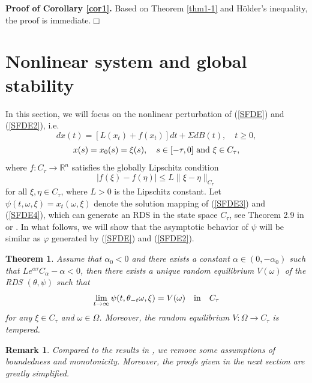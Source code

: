 \documentclass[preprint,12pt]{elsarticle}
\newtheorem{theorem}{Theorem}[section]
\newtheorem{remark}{Remark}[section]
\begin{document}
\noindent
{\bf Proof of Corollary \ref{cor1}.} Based on Theorem \ref{thm1-1} and H\"{o}lder's inequality, the proof is immediate.\quad\quad$\Box$


\section{Nonlinear system and global stability}
In this section, we will focus on the nonlinear perturbation of (\ref{SFDE}) and (\ref{SFDE2}), i.e.
\begin{equation}\label{SFDE3}
  dx(t)=[L(x_t)+f(x_t)]dt+\Sigma dB(t),\quad t\geq0,
\end{equation}
\begin{equation}\label{SFDE4}x(s)=x_0(s)=\xi(s),\quad s\in[-\tau,0]\ {\rm and}\ \xi\in C_\tau,
\end{equation}
where $f:C_\tau\rightarrow\mathbb{R}^n$ satisfies the globally Lipschitz condition
\begin{equation}\label{Lip}
\bigl|f(\xi)-f(\eta)\bigr|\leq L\|\xi-\eta\|_{C_\tau}
\end{equation}
for all $\xi,\eta\in C_\tau$, where $L>0$ is the Lipschitz constant.  Let $\psi(t,\omega,\xi)=x_t(\omega,\xi)$ denote the solution mapping of (\ref{SFDE3}) and (\ref{SFDE4}), which can generate an RDS in the state space $C_\tau$, see Theorem 2.9 in \cite{BJX} or \cite{JL3}. In what follows, we will show that the asymptotic behavior of $\psi$ will be similar as $\varphi$ generated by (\ref{SFDE}) and (\ref{SFDE2}).

\begin{theorem}\label{thm2} Assume that $\alpha_0<0$ and there exists a constant $\alpha\in(0,-\alpha_0)$ such that $Le^{\alpha\tau}C_\alpha-\alpha<0$, then there exists a unique random equilibrium $V(\omega)$ of the RDS $(\theta,\psi)$ such that
\begin{equation}\label{Conclu4}
\lim_{t\rightarrow\infty}\psi(t,\theta_{-t}\omega,\xi)=V(\omega)\quad {\rm in}\quad C_\tau
\end{equation}
for any $\xi\in C_\tau$ and $\omega\in\Omega$. Moreover, the random equilibrium $V:\Omega\rightarrow C_\tau$ is tempered.
\end{theorem}

\begin{remark}
{\rm Compared to the results in \cite{JL1,JL3}, we remove some assumptions of boundedness and monotonicity. Moreover, the proofs given in the next section are greatly simplified.
}
\end{remark}
\end{document}
